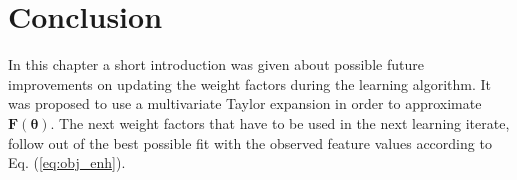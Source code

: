 \section{Conclusion}\label{s:conclusion_enh}
In this chapter a short introduction was given about possible future improvements on updating the weight factors during the learning algorithm. It was proposed to use a multivariate Taylor expansion in order to approximate $\bm{F}(\bm{\theta})$. The next weight factors that have to be used in the next learning iterate, follow out of the best possible fit with the observed feature values according to Eq. (\ref{eq:obj_enh}).
 
%		


